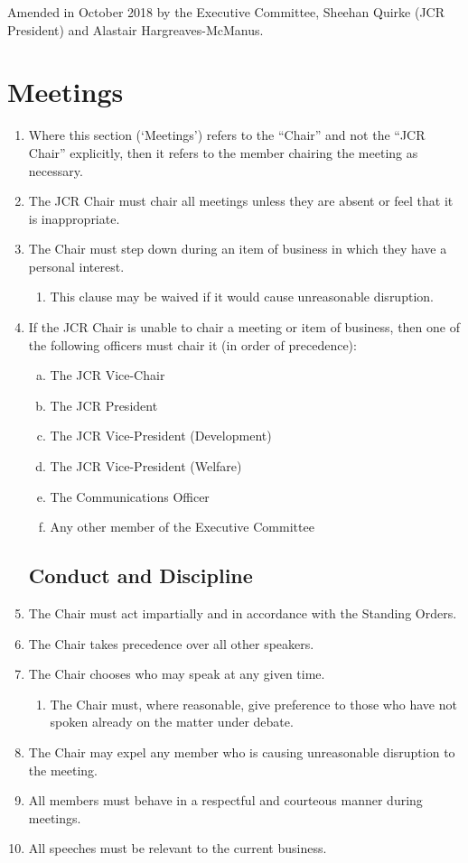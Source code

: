 \documentclass[12pt]{article}  %
\begin{document}
Amended in October 2018 by the Executive Committee, Sheehan Quirke (JCR President) and Alastair Hargreaves-McManus.
\newpage
\tableofcontents{}
\newpage


\section{Meetings}
\begin{enumerate}
    \subsection{The Chair}
	\item Where this section (‘Meetings’) refers to the “Chair” and not the “JCR Chair” explicitly, then it refers to the member chairing the meeting as necessary.
	\item The JCR Chair must chair all meetings unless they are absent or feel that it is inappropriate.
	\item The Chair must step down during an item of business in which they have a personal interest.
	\begin{enumerate}
		\item This clause may be waived if it would cause unreasonable disruption.
	\end{enumerate}
	\item If the JCR Chair is unable to chair a meeting or item of business, then one of the following officers must chair it (in order of precedence):
	\begin{enumerate}[(a)]
		\item The JCR Vice-Chair
		\item The JCR President
		\item The JCR Vice-President (Development)
		\item The JCR Vice-President (Welfare)
		\item The Communications Officer
		\item Any other member of the Executive Committee
	\end{enumerate}
	\subsection{Conduct and Discipline}
	\item The Chair must act impartially and in accordance with the Standing Orders.
	\item The Chair takes precedence over all other speakers.
	\item The Chair chooses who may speak at any given time.
	\begin{enumerate}
		\item The Chair must, where reasonable, give preference to those who have not spoken already on the matter under debate.
	\end{enumerate}
	\item The Chair may expel any member who is causing unreasonable disruption to the meeting.
	\item All members must behave in a respectful and courteous manner during meetings.
	\item All speeches must be relevant to the current business.

\end{enumerate}
\end{document}
